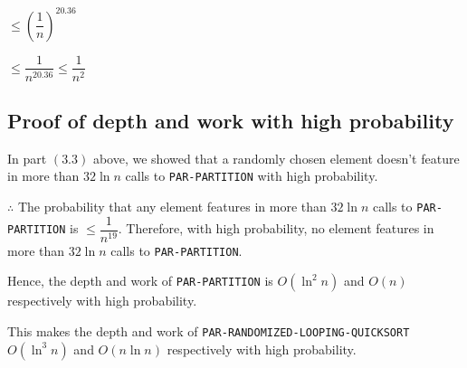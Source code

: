 \documentclass{article}
\begin{document}
$\le \left(\dfrac{1}{n}\right)^{20.36}$

$\le \dfrac{1}{n^{20.36}} \le \dfrac{1}{n^{2}}$

\subsection{Proof of depth and work with high probability}

In part $(3.3)$ above, we showed that a randomly chosen element
doesn't feature in more than $32\ln{n}$ calls to
\texttt{PAR-PARTITION} with high probability.

$\therefore$ The probability that any element features in more
than $32\ln{n}$ calls to \texttt{PAR-PARTITION} is $\le
\dfrac{1}{n^{19}}$. Therefore, with high probability, no element
features in more than $32\ln{n}$ calls to \texttt{PAR-PARTITION}.

Hence, the depth and work of \texttt{PAR-PARTITION} is $O(\ln^2{n})$
and $O(n)$ respectively with high probability.

This makes the depth and work of
\texttt{PAR-RANDOMIZED-LOOPING-QUICKSORT} $O(\ln^3{n})$ and
$O(n\ln{n})$ respectively with high probability.
\end{document}
